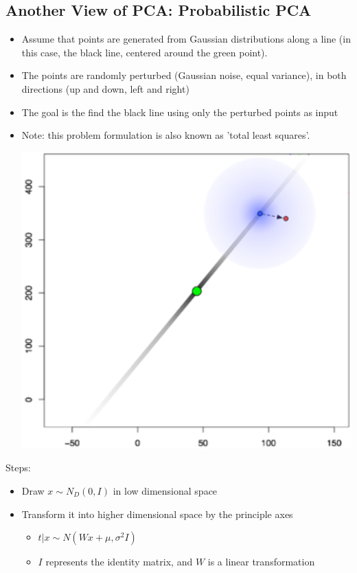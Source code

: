 \documentclass[10pt]{article}
\begin{document}
\subsection*{Another View of PCA: Probabilistic PCA}
\begin{itemize}
    \item Assume that points are generated from Gaussian distributions along a line (in this case, the black line, centered around the green point).
    \item The points are randomly perturbed (Gaussian noise, equal variance), in both directions (up and down, left and right)
    \item The goal is the find the black line using only the perturbed points as input
    \item Note: this problem formulation is also known as 'total least squares'.
    \begin{center}
        \includegraphics*[scale=0.8]{W8_8.png}
    \end{center}
\end{itemize}
Steps:
\begin{itemize}
    \item Draw $x \sim N_D(0, I)$ in low dimensional space
    \item Transform it into higher dimensional space by the principle axes
    \begin{itemize}
        \item $t \vert x \sim N(Wx + \mu, \sigma^2 I)$
        \item $I$ represents the identity matrix, and $W$ is a linear transformation
    \end{itemize}
\end{itemize}
\end{document}
